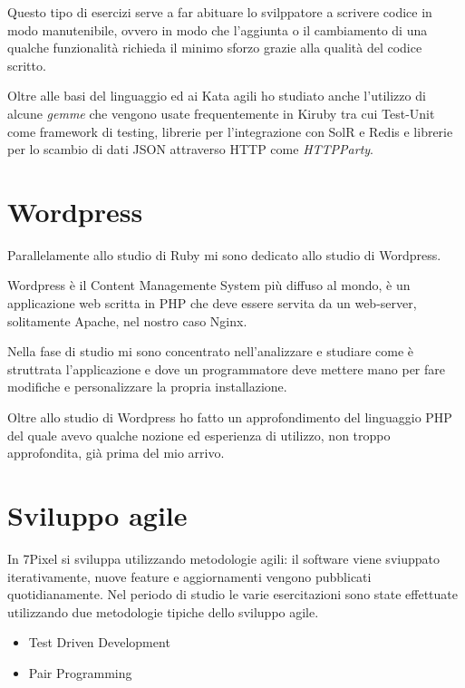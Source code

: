 Questo tipo di esercizi serve a far abituare
lo svilppatore a scrivere codice in modo manutenibile, ovvero in modo che l'aggiunta o il cambiamento di una qualche 
funzionalità richieda il minimo sforzo grazie alla qualità del codice scritto.

Oltre alle basi del linguaggio ed ai Kata agili ho studiato anche l'utilizzo di alcune \emph{gemme} che vengono
usate frequentemente in Kiruby tra cui Test-Unit come framework di testing, librerie per l'integrazione
con SolR e Redis e librerie per lo scambio di dati JSON attraverso HTTP come \emph{HTTPParty}.

\section{Wordpress}

Parallelamente allo studio di Ruby mi sono dedicato allo studio di Wordpress.

Wordpress è il Content Managemente System più diffuso al mondo, è un applicazione web scritta in PHP
che deve essere servita da un web-server, solitamente Apache, nel nostro caso Nginx.

Nella fase di studio mi sono concentrato nell'analizzare e studiare come è struttrata l'applicazione
e dove un programmatore deve mettere mano per fare modifiche e personalizzare la propria installazione.

Oltre allo studio di Wordpress ho fatto un approfondimento del linguaggio PHP del quale avevo qualche
nozione ed esperienza di utilizzo, non troppo approfondita, già prima del mio arrivo. 





\section{Sviluppo agile}

In 7Pixel si sviluppa utilizzando metodologie agili: il software viene sviuppato
iterativamente, nuove feature e aggiornamenti vengono pubblicati quotidianamente.
Nel periodo di studio le varie esercitazioni sono state effettuate
utilizzando due metodologie tipiche dello sviluppo agile.

\begin{itemize}
\item Test Driven Development
\item Pair Programming
\end{itemize}

